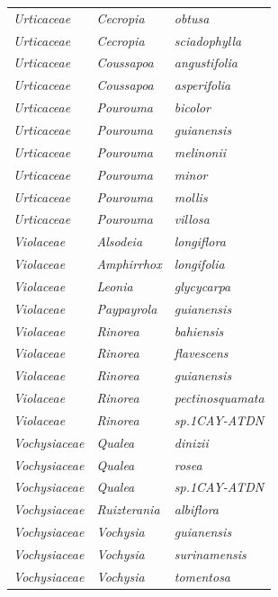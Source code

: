 \documentclass[fleqn,10pt]{ArtEcoFoG} %
\begin{document}
\begin{table}[t]
\begin{tabular}{lll}
\em{Urticaceae} & \em{Cecropia} & \em{obtusa}\\
\em{Urticaceae} & \em{Cecropia} & \em{sciadophylla}\\
\em{Urticaceae} & \em{Coussapoa} & \em{angustifolia}\\
\addlinespace
\em{Urticaceae} & \em{Coussapoa} & \em{asperifolia}\\
\em{Urticaceae} & \em{Pourouma} & \em{bicolor}\\
\em{Urticaceae} & \em{Pourouma} & \em{guianensis}\\
\em{Urticaceae} & \em{Pourouma} & \em{melinonii}\\
\em{Urticaceae} & \em{Pourouma} & \em{minor}\\
\addlinespace
\em{Urticaceae} & \em{Pourouma} & \em{mollis}\\
\em{Urticaceae} & \em{Pourouma} & \em{villosa}\\
\em{Violaceae} & \em{Alsodeia} & \em{longiflora}\\
\em{Violaceae} & \em{Amphirrhox} & \em{longifolia}\\
\em{Violaceae} & \em{Leonia} & \em{glycycarpa}\\
\addlinespace
\em{Violaceae} & \em{Paypayrola} & \em{guianensis}\\
\em{Violaceae} & \em{Rinorea} & \em{bahiensis}\\
\em{Violaceae} & \em{Rinorea} & \em{flavescens}\\
\em{Violaceae} & \em{Rinorea} & \em{guianensis}\\
\em{Violaceae} & \em{Rinorea} & \em{pectinosquamata}\\
\addlinespace
\em{Violaceae} & \em{Rinorea} & \em{sp.1CAY-ATDN}\\
\em{Vochysiaceae} & \em{Qualea} & \em{dinizii}\\
\em{Vochysiaceae} & \em{Qualea} & \em{rosea}\\
\em{Vochysiaceae} & \em{Qualea} & \em{sp.1CAY-ATDN}\\
\em{Vochysiaceae} & \em{Ruizterania} & \em{albiflora}\\
\addlinespace
\em{Vochysiaceae} & \em{Vochysia} & \em{guianensis}\\
\em{Vochysiaceae} & \em{Vochysia} & \em{surinamensis}\\
\em{Vochysiaceae} & \em{Vochysia} & \em{tomentosa}\\
\bottomrule
\end{tabular}
\end{table}\ignorespacesafterend



\makeatletter

\makeatother


\end{document}
